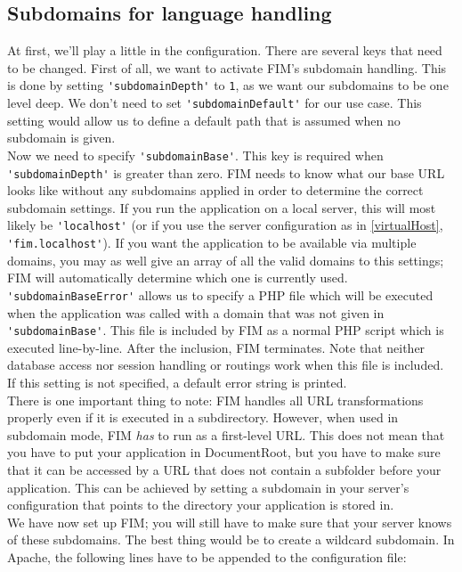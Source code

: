\documentclass{scrartcl}
\begin{document}
   \subsection{Subdomains for language handling}
      At first, we'll play a little in the configuration. There are several keys that need to be changed. First of all, we want to activate FIM's subdomain handling. This is done by setting \lstinline!'subdomainDepth'! to \lstinline!1!, as we want our subdomains to be one level deep. We don't need to set \lstinline!'subdomainDefault'! for our use case. This setting would allow us to define a default path that is assumed when no subdomain is given. \\
      Now we need to specify \lstinline!'subdomainBase'!. This key is required when \lstinline!'subdomainDepth'! is greater than zero. FIM needs to know what our base URL looks like without any subdomains applied in order to determine the correct subdomain settings. If you run the application on a local server, this will most likely be \lstinline!'localhost'! (or if you use the server configuration as in \autoref{virtualHost}, \lstinline!'fim.localhost'!). If you want the application to be available via multiple domains, you may as well give an array of all the valid domains to this settings; FIM will automatically determine which one is currently used. \lstinline!'subdomainBaseError'! allows us to specify a PHP file which will be executed when the application was called with a domain that was not given in \lstinline!'subdomainBase'!. This file is included by FIM as a normal PHP script which is executed line-by-line. After the inclusion, FIM terminates. Note that neither database access nor session handling or routings work when this file is included. If this setting is not specified, a default error string is printed. \\ There is one important thing to note: FIM handles all URL transformations properly even if it is executed in a subdirectory. However, when used in subdomain mode, FIM \emph{has} to run as a first-level URL. This does not mean that you have to put your application in DocumentRoot, but you have to make sure that it can be accessed by a URL that does not contain a subfolder before your application. This can be achieved by setting a subdomain in your server's configuration that points to the directory your application is stored in. \\
      We have now set up FIM; you will still have to make sure that your server knows of these subdomains. The best thing would be to create a wildcard subdomain. In Apache, the following lines have to be appended to the configuration file:
\end{document}
